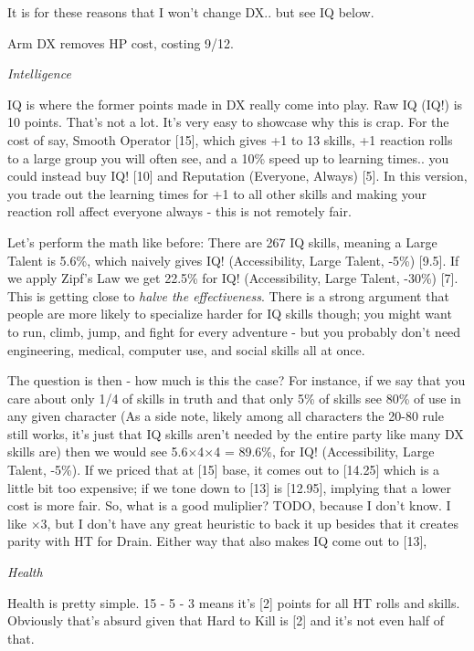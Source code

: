 \begin{multicols*}{2}
	It is for these reasons that I won't change DX.. but see IQ below.	
	
	Arm DX removes HP cost, costing 9/12.
	
	\textit{Intelligence}
	
	IQ is where the former points made in DX really come into play. Raw IQ (IQ!) is 10 points. That's not a lot. It's very easy to showcase why this is crap. For the cost of say, Smooth Operator [15], which gives +1 to 13 skills, +1 reaction rolls to a large group you will often see, and a 10\% speed up to learning times.. you could instead buy IQ! [10] and Reputation (Everyone, Always) [5]. In this version, you trade out the learning times for +1 to all other skills and making your reaction roll affect everyone always - this is not remotely fair.
	
	Let's perform the math like before: There are 267 IQ skills, meaning a Large Talent is 5.6\%, which naively gives IQ! (Accessibility, Large Talent, -5\%) [9.5]. If we apply Zipf's Law we get 22.5\% for IQ! (Accessibility, Large Talent, -30\%) [7]. This is getting close to \textit{halve the effectiveness}. There is a strong argument that people are more likely to specialize harder for IQ skills though; you might want to run, climb, jump, and fight for every adventure - but you probably don't need engineering, medical, computer use, and social skills all at once. 
	
	The question is then - how much is this the case? For instance, if we say that you care about only 1/4 of skills in truth and that only 5\% of skills see 80\% of use in any given character (As a side note, likely among all characters the 20-80 rule still works, it's just that IQ skills aren't needed by the entire party like many DX skills are) then we would see 5.6$\times$4$\times$4 = 89.6\%, for IQ! (Accessibility, Large Talent, -5\%). If we priced that at [15] base, it comes out to [14.25] which is a little bit too expensive; if we tone down to [13] is [12.95], implying that a lower cost is more fair. So, what is a good muliplier? TODO, because I don't know. I like $\times$3, but I don't have any great heuristic to back it up besides that it creates parity with HT for Drain. Either way that also makes IQ come out to [13],
	
	\textit{Health}
	
	Health is pretty simple. 15 - 5 - 3 means it's [2] points for all HT rolls and skills. Obviously that's absurd given that Hard to Kill is [2] and it's not even half of that.
	

\end{multicols*}
